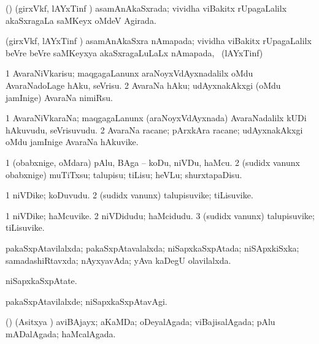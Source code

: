 \bentry
{}
\gl{\gu}
\bmng
(\vAyx) (girxVkf, lAYxTinf \vAyx) asamAnAkaSxrada; vividha viBakitx rUpagaLalilx akaSxragaLa saMKeyx oMdeV Agirada. 
\emng
\eentry

\bentry
{}
\gl{\nA}
\bmng
(girxVkf, lAYxTinf \vAyx) asamAnAkaSxra nAmapada; vividha viBakitx rUpagaLalilx beVre beVre saMKeyxya akaSxragaLuLaLx nAmapada, \udA\ (lAYxTinf)  
\emng
\eentry

\bentry
{}
\gl{\sakirx}
\bmng
\bnum
\num{1} AvaraNiVkarisu; maqgagaLanunx araNoyxVdAyxnadalilx oMdu AvaraNadoLage hAku, seVrisu. 
\num{2} AvaraNa hAku; udAyxnakAkxgi (oMdu jamInige) AvaraNa nimiRsu. 
\enum
\emng
\eentry

\bentry
{}
\gl{\nA}
\bmng
\bnum
\num{1} AvaraNiVkaraNa; maqgagaLanunx (araNoyxVdAyxnada) AvaraNadalilx kUDi hAkuvudu, seVrisuvudu. 
\num{2} AvaraNa racane; pArxkAra racane; udAyxnakAkxgi oMdu jamInige AvaraNa hAkuvike. 
\enum
\emng
\eentry

\bentry
{}
\gl{\sakirx}
\bmng
\bnum
\num{1} (obabxnige, oMdara) pAlu, BAga -- koDu, niVDu, haMcu. 
\num{2} (sudidx \mo vanunx obabxnige) muTiTxsu; talupisu; tiLisu; heVLu; shurxtapaDisu. 
\enum
\emng
\eentry

\bentry
{}
\gl{\nA}
\bmng
\bnum
\num{1} niVDike; koDuvudu. 
\num{2} (sudidx \mo vanunx) talupisuvike; tiLisuvike. 
\enum
\emng
\eentry

\bentry
{}
\gl{\nA}
\bmng
\bnum
\num{1} niVDike; haMcuvike. 
\num{2} niVDidudu; haMcidudu. 
\num{3} (sudidx \mo vanunx) talupisuvike; tiLisuvike. 
\enum
\emng
\eentry

\bentry
{}
\gl{\gu}
\bmng
pakaSxpAtavilalxda; pakaSxpAtavalalxda; niSapxkaSxpAtada; niSApxkiSxka; samadashiRtavxda; nAyxyavAda; yAva kaDegU olavilalxda. 
\emng
\eentry

\bentry
{}
\gl{\nA}
\bmng
niSapxkaSxpAtate. 
\emng
\eentry

\bentry
{}
\gl{\kirxvi}
\bmng
pakaSxpAtavilalxde; niSapxkaSxpAtavAgi. 
\emng
\eentry

\bentry
{}
\gl{\gu}
\bmng
(\nAyxshA) (Asitxya \vi) aviBAjayx; aKaMDa; oDeyalAgada; viBajisalAgada; pAlu mADalAgada; haMcalAgada. 
\emng
\eentry

